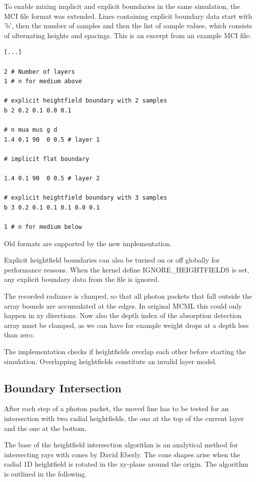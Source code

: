 \documentclass[]{article}
\begin{document}
To enable mixing implicit and explicit boundaries in the same simulation, the MCI file format was extended. Lines containing explicit boundary data start with 'b', then the number of samples and then the list of sample values, which consists of alternating heights and spacings. This is an excerpt from an example MCI file:

\begin{lstlisting}
[...]

2 # Number of layers
1 # n for medium above

# explicit heightfield boundary with 2 samples
b 2 0.2 0.1 0.0 0.1

# n mua mus g d
1.4 0.1 90  0 0.5 # layer 1

# implicit flat boundary

1.4 0.1 90  0 0.5 # layer 2

# explicit heightfield boundary with 3 samples
b 3 0.2 0.1 0.1 0.1 0.0 0.1

1 # n for medium below
\end{lstlisting}

Old formats are supported by the new implementation.

Explicit heightfield boundaries can also be turned on or off globally for performance reasons. When the kernel define IGNORE\_HEIGHTFIELDS is set, any explicit boundary data from the file is ignored.

The recorded radiance is clamped, so that all photon packets that fall outside the array bounds are accumulated at the edges. In original MCML this could only happen in xy directions. Now also the depth index of the absorption detection array must be clamped, as we can have for example weight drops at a depth less than zero.

The implementation checks if heightfields overlap each other before starting the simulation. Overlapping heightfields constitute an invalid layer model.

\subsection{Boundary Intersection}

After each step of a photon packet, the moved line has to be tested for an intersection with two radial heightfields, the one at the top of the current layer and the one at the bottom.

The base of the heightfield intersection algorithm is an analytical method for intersecting rays with cones by David Eberly\cite{schneider2002geometric}. The cone shapes arise when the radial 1D heightfield is rotated in the xy-plane around the origin. The algorithm is outlined in the following.
\end{document}
